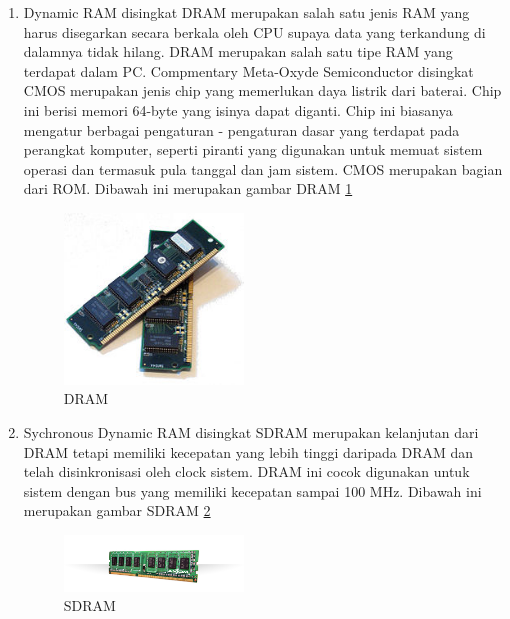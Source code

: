 \begin{enumerate}
\item Dynamic RAM disingkat DRAM merupakan salah satu jenis RAM yang harus disegarkan secara berkala oleh CPU supaya data yang terkandung di dalamnya tidak hilang. DRAM merupakan salah satu tipe RAM yang terdapat dalam PC.
Compmentary Meta-Oxyde Semiconductor disingkat CMOS merupakan jenis chip yang memerlukan daya listrik dari baterai. Chip ini berisi memori 64-byte yang isinya dapat diganti. Chip ini biasanya mengatur berbagai pengaturan - pengaturan dasar yang terdapat 
pada perangkat komputer, seperti piranti yang digunakan untuk memuat sistem operasi dan termasuk pula tanggal dan jam sistem. CMOS merupakan bagian dari ROM. Dibawah ini merupakan gambar DRAM
\ref{labelgambar1}
\begin{figure}[htbp]
\centering
\includegraphics[width=0.45\textwidth]{figures/image/DRAM.jpg}
\caption{DRAM}
\label{labelgambar1}
\end{figure}

\item Sychronous Dynamic RAM disingkat SDRAM merupakan kelanjutan dari DRAM tetapi memiliki kecepatan yang lebih tinggi daripada DRAM dan telah disinkronisasi oleh clock sistem. DRAM ini cocok digunakan untuk sistem dengan bus yang memiliki kecepatan sampai 100 MHz. Dibawah ini merupakan gambar SDRAM
\ref{labelgambar2}
\begin{figure}[htbp]
\centering
\includegraphics[width=0.45\textwidth]{figures/image/sdram.jpg}
\caption{SDRAM}
\label{labelgambar2}
\end{figure}


\end{enumerate}
